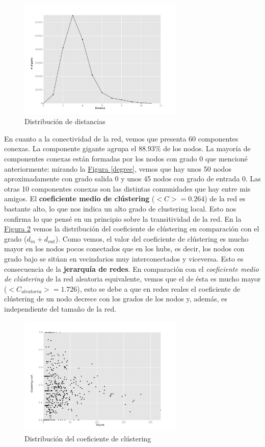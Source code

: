 \documentclass[10pt,a4paper,spanish]{article}
\numberwithin{equation}{section} %
\numberwithin{figure}{section} %
\numberwithin{table}{section} %
\begin{document}
\begin{figure}[!h]
    \centering
    \includegraphics[width=0.7\textwidth]{dist_hist}
    \caption{Distribución de distancias}
    \label{dist}
\end{figure}

En cuanto a la conectividad de la red, vemos que presenta 60 componentes conexas. La componente gigante agrupa el $88.93\%$ de los nodos. La mayoría de componentes conexas están formadas por los nodos con grado 0 que mencioné anteriormente: mirando la \hyperref[degree]{Figura \ref*{degree}}, vemos que hay unos 50 nodos aproximadamente con grado salida 0 y unos 45 nodos con grado de entrada 0. Las otras 10 componentes conexas son las distintas comunidades que hay entre mis amigos. El \textbf{coeficiente medio de clústering} ($<C> = 0.264$) de la red es bastante alto, lo que nos indica un alto grado de clustering local. Esto nos confirma lo que pensé en un principio sobre la transitividad de la red. En la \hyperref[clust]{Figura \ref*{clust}} vemos la distribución del coeficiente de clústering en comparación con el grado ($d_{in}+d_{out}$). Como vemos, el valor del coeficiente de clústering es mucho mayor en los nodos pocos conectados que en los hubs, es decir, los nodos con grado bajo se sitúan en vecindarios muy interconectados y viceversa. Esto es consecuencia de la \textbf{jerarquía de redes}. En comparación con el \textit{coeficiente medio de clústering} de la red aleatoria equivalente, vemos que el de ésta es mucho mayor ($<C_{aleatoria}> = 1.726$), esto se debe a que en redes reales el coeficiente de clústering de un nodo decrece con los grados de los nodos y, además, es independiente del tamaño de la red.

\begin{figure}[!h]
    \centering
    \includegraphics[width=0.7\textwidth]{clust_hist}
    \caption{Distribución del coeficiente de clústering}
    \label{clust}
\end{figure}
\end{document}
